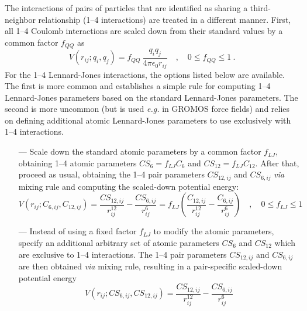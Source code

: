 \documentclass[10pt,a4paper]{report}
\numberwithin{equation}{section}
\begin{document}
The interactions of pairs of particles that are identified as sharing
a third-neighbor relationship (1--4 interactions) are treated in a
different manner. First, all 1--4 Coulomb interactions are scaled down from
their standard values by a common factor $f_{QQ}$ as
\begin{equation}
  \label{eq:fudge-QQ}
    V(r_{ij};q_i,q_j) = f_{QQ}\ \frac{q_i q_j}{4\pi\epsilon_0 r_{ij}} \quad , \quad 0 \leq f_{QQ} \leq 1\ .
\end{equation}
For the 1--4 Lennard-Jones interactions, the options listed below are available.
The first is more common and establishes a simple rule for computing 1--4 Lennard-Jones parameters based on the standard Lennard-Jones parameters.
The second is more uncommon (but is used \textit{e.g.} in GROMOS force fields) and relies on defining additional atomic Lennard-Jones parameters to use exclusively with 1--4 interactions. 
\begin{itemize}
\item [---] Scale down the standard atomic parameters by a common factor $f_{LJ}$, obtaining 1--4 atomic parameters $CS_{6} = f_{LJ}C_{6}$ and $CS_{12} = f_{LJ}C_{12}$. After that, proceed as usual, obtaining the 1--4 pair parameters $CS_{12,ij}$ and $CS_{6,ij}$ \textit{via} mixing rule and computing the scaled-down potential energy:
  \begin{equation}
    \label{eq:fudge-LJ}
    V(r_{ij};C_{6,ij},C_{12,ij}) =   \frac{CS_{12,ij}}{r_{ij}^{12}} - \frac{CS_{6,ij}}{r_{ij}^6} = f_{LJ} \left( \frac{C_{12,ij}}{r_{ij}^{12}} - \frac{C_{6,ij}}{r_{ij}^6} \right) \quad , \quad 0 \leq f_{LJ} \leq 1
  \end{equation}
\item [---] Instead of using a fixed factor $f_{LJ}$ to modify the atomic parameters, specify an additional arbitrary set of atomic parameters $CS_6$ and $CS_{12}$ which are exclusive to 1--4 interactions. The 1--4 pair parameters $CS_{12,ij}$ and $CS_{6,ij}$ are then obtained \textit{via} mixing rule, resulting in a pair-specific scaled-down potential energy
    \begin{equation}
    \label{eq:atomic-LJ}
    V(r_{ij};CS_{6,ij},CS_{12,ij}) =  \frac{CS_{12,ij}}{r_{ij}^{12}} - \frac{CS_{6,ij}}{r_{ij}^6} 
  \end{equation}
\end{itemize}
\end{document}
